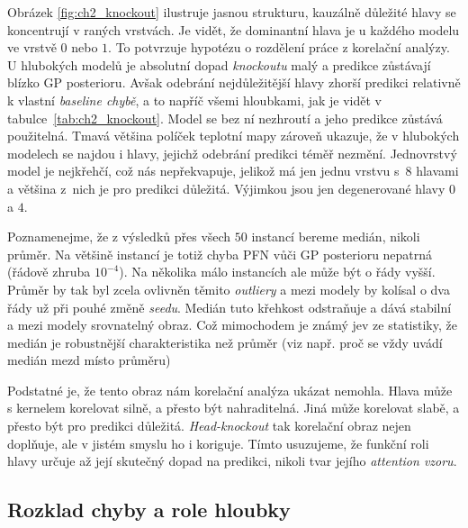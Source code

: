 Obrázek \ref{fig:ch2_knockout} ilustruje jasnou strukturu, kauzálně důležité hlavy se koncentrují v raných vrstvách.
Je vidět, že dominantní hlava je u každého modelu ve vrstvě $0$ nebo $1$.
To potvrzuje hypotézu o rozdělení práce z korelační analýzy.
U hlubokých modelů je absolutní dopad \emph{knockoutu} malý a predikce zůstávají blízko GP posterioru.
Avšak odebrání nejdůležitější hlavy zhorší predikci relativně k vlastní \emph{baseline chybě}, a to napříč všemi hloubkami, jak je vidět v tabulce~\ref{tab:ch2_knockout}.
Model se bez ní nezhroutí a jeho predikce zůstává použitelná.
Tmavá většina políček teplotní mapy zároveň ukazuje, že v hlubokých modelech se najdou i hlavy, jejichž odebrání predikci téměř nezmění.
Jednovrstvý model je nejkřehčí, což nás nepřekvapuje, jelikož má jen jednu vrstvu s~$8$ hlavami a většina z~nich je pro predikci důležitá. Výjimkou jsou jen degenerované hlavy $0$ a $4$.
\par

Poznamenejme, že z výsledků přes všech $50$ instancí bereme medián, nikoli průměr.
Na většině instancí je totiž chyba PFN vůči GP posterioru nepatrná (řádově zhruba $10^{-4}$).
Na několika málo instancích ale může být o řády vyšší.
Průměr by tak byl zcela ovlivněn těmito \emph{outliery} a mezi modely by kolísal o dva řády už při pouhé změně \emph{seedu}.
Medián tuto křehkost odstraňuje a dává stabilní a mezi modely srovnatelný obraz.
Což mimochodem je známý jev ze statistiky, že medián je robustnější charakteristika než průměr (viz např. proč se vždy uvádí medián mezd místo průměru)
\par

Podstatné je, že tento obraz nám korelační analýza ukázat nemohla.
Hlava může s kernelem korelovat silně, a přesto být nahraditelná.
Jiná může korelovat slabě, a přesto být pro predikci důležitá.
\mbox{\emph{Head-knockout}} tak korelační obraz nejen doplňuje, ale v jistém smyslu ho i koriguje.
Tímto usuzujeme, že funkční roli hlavy určuje až její skutečný dopad na predikci, nikoli tvar jejího \emph{attention vzoru}.

\subsection{Rozklad chyby a role hloubky}
\label{subsec:ch2-bias-variance}

